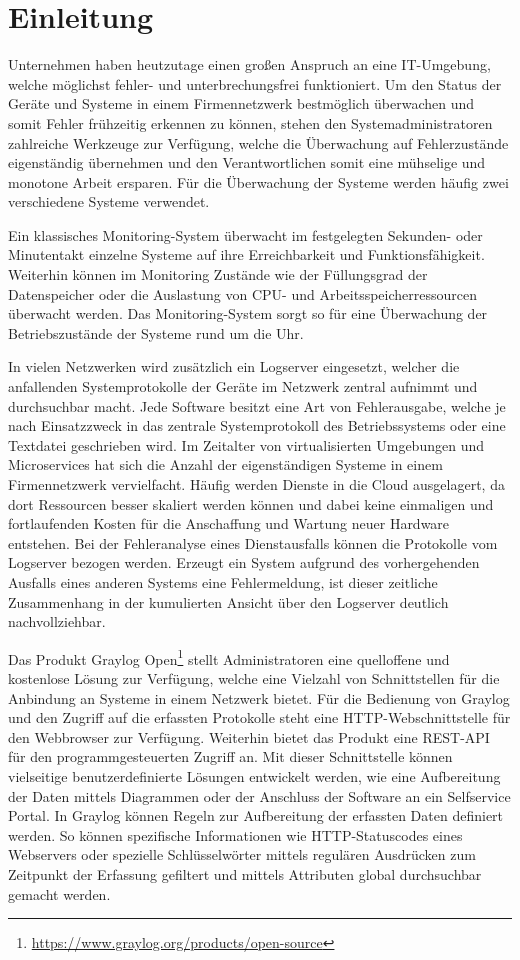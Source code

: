 \chapter{Einleitung}

Unternehmen haben heutzutage einen großen Anspruch an eine IT-Umgebung, welche möglichst fehler- und unterbrechungsfrei funktioniert. Um den Status der Geräte und Systeme in einem Firmennetzwerk bestmöglich überwachen und somit Fehler frühzeitig erkennen zu können, stehen den Systemadministratoren zahlreiche Werkzeuge zur Verfügung, welche die Überwachung auf Fehlerzustände eigenständig übernehmen und den Verantwortlichen somit eine mühselige und monotone Arbeit ersparen. Für die Überwachung der Systeme werden häufig zwei verschiedene Systeme verwendet. 

Ein klassisches Monitoring-System überwacht im festgelegten Sekunden- oder Minutentakt einzelne Systeme auf ihre Erreichbarkeit und Funktionsfähigkeit. Weiterhin können im Monitoring Zustände wie der Füllungsgrad der Datenspeicher oder die Auslastung von CPU- und Arbeitsspeicherressourcen überwacht werden. Das Monitoring-System sorgt so für eine Überwachung der Betriebszustände der Systeme rund um die Uhr. 

In vielen Netzwerken wird zusätzlich ein Logserver eingesetzt, welcher die anfallenden Systemprotokolle der Geräte im Netzwerk zentral aufnimmt und durchsuchbar macht. Jede Software besitzt eine Art von Fehlerausgabe, welche je nach Einsatzzweck in das zentrale Systemprotokoll des Betriebssystems oder eine Textdatei geschrieben wird. Im Zeitalter von virtualisierten Umgebungen und Microservices hat sich die Anzahl der eigenständigen Systeme in einem Firmennetzwerk vervielfacht. Häufig werden Dienste in die Cloud ausgelagert, da dort Ressourcen besser skaliert werden können und dabei keine einmaligen und fortlaufenden Kosten für die Anschaffung und Wartung neuer Hardware entstehen. Bei der Fehleranalyse eines Dienstausfalls können die Protokolle vom Logserver bezogen werden. Erzeugt ein System aufgrund des vorhergehenden Ausfalls eines anderen Systems eine Fehlermeldung, ist dieser zeitliche Zusammenhang in der kumulierten Ansicht über den Logserver deutlich nachvollziehbar.

Das Produkt Graylog Open\footnote{\url{https://www.graylog.org/products/open-source}} stellt Administratoren eine quelloffene und kostenlose Lösung zur Verfügung, welche eine Vielzahl von Schnittstellen für die Anbindung an Systeme in einem Netzwerk bietet. Für die Bedienung von Graylog und den Zugriff auf die erfassten Protokolle steht eine HTTP-Webschnittstelle für den Webbrowser zur Verfügung. Weiterhin bietet das Produkt eine REST-API für den programmgesteuerten Zugriff an. Mit dieser Schnittstelle können vielseitige benutzerdefinierte Lösungen entwickelt werden, wie eine Aufbereitung der Daten mittels Diagrammen oder der Anschluss der Software an ein Selfservice Portal. In Graylog können Regeln zur Aufbereitung der erfassten Daten definiert werden. So können spezifische Informationen wie HTTP-Statuscodes eines Webservers oder spezielle Schlüsselwörter mittels regulären Ausdrücken zum Zeitpunkt der Erfassung gefiltert und mittels Attributen global durchsuchbar gemacht werden.

